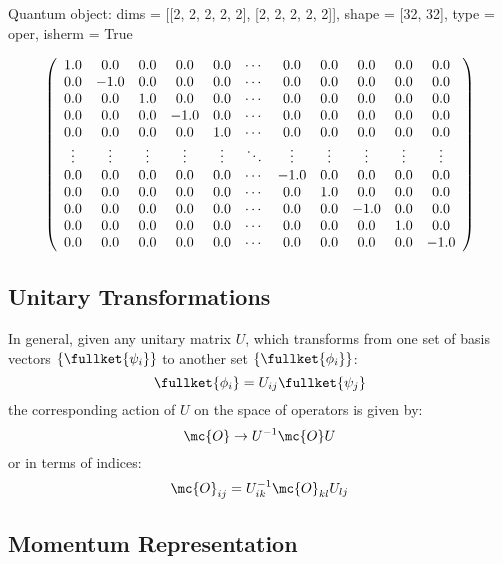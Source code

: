\documentclass{article}
\begin{document}
    Quantum object: dims = {[}{[}2, 2, 2, 2, 2{]}, {[}2, 2, 2, 2, 2{]}{]},
shape = {[}32, 32{]}, type = oper, isherm = True

\begin{equation*}\left(\begin{array}{*{11}c}1.0 & 0.0 & 0.0 & 0.0 & 0.0 & \cdots & 0.0 & 0.0 & 0.0 & 0.0 & 0.0\\0.0 & -1.0 & 0.0 & 0.0 & 0.0 & \cdots & 0.0 & 0.0 & 0.0 & 0.0 & 0.0\\0.0 & 0.0 & 1.0 & 0.0 & 0.0 & \cdots & 0.0 & 0.0 & 0.0 & 0.0 & 0.0\\0.0 & 0.0 & 0.0 & -1.0 & 0.0 & \cdots & 0.0 & 0.0 & 0.0 & 0.0 & 0.0\\0.0 & 0.0 & 0.0 & 0.0 & 1.0 & \cdots & 0.0 & 0.0 & 0.0 & 0.0 & 0.0\\\vdots & \vdots & \vdots & \vdots & \vdots & \ddots & \vdots & \vdots & \vdots & \vdots & \vdots\\0.0 & 0.0 & 0.0 & 0.0 & 0.0 & \cdots & -1.0 & 0.0 & 0.0 & 0.0 & 0.0\\0.0 & 0.0 & 0.0 & 0.0 & 0.0 & \cdots & 0.0 & 1.0 & 0.0 & 0.0 & 0.0\\0.0 & 0.0 & 0.0 & 0.0 & 0.0 & \cdots & 0.0 & 0.0 & -1.0 & 0.0 & 0.0\\0.0 & 0.0 & 0.0 & 0.0 & 0.0 & \cdots & 0.0 & 0.0 & 0.0 & 1.0 & 0.0\\0.0 & 0.0 & 0.0 & 0.0 & 0.0 & \cdots & 0.0 & 0.0 & 0.0 & 0.0 & -1.0\\\end{array}\right)\end{equation*}

    

    \subsection{Unitary Transformations}\label{unitary-transformations}

In general, given any unitary matrix \(U\), which transforms from one
set of basis vectors \(\{\fullket{\psi_i}\}\) to another set
\(\{\fullket{\phi_i}\}\):
\[ \fullket{\phi_i} = U_{ij} \fullket{\psi_j} \] the corresponding
action of \(U\) on the space of operators is given by:
\[ \mc{O} \rightarrow U^{-1} \mc{O} U \] or in terms of indices:
\[ \mc{O}_{ij} = U^{-1}_{ik} \mc{O}_{kl} U_{lj} \]

    \subsection{Momentum Representation}\label{momentum-representation}
\end{document}
